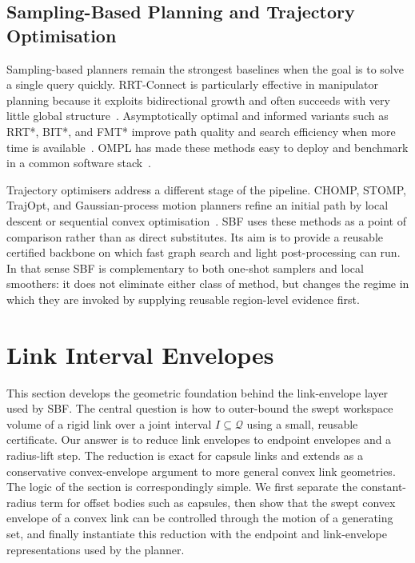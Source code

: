 \documentclass[journal]{IEEEtran}
\newcommand{\sbf}{\textsc{SBF}}
\newcommand{\Q}{\ensuremath{\mathcal{Q}}}
\begin{document}
\subsection{Sampling-Based Planning and Trajectory Optimisation}

Sampling-based planners remain the strongest baselines when the goal is to solve
a single query quickly. RRT-Connect is particularly effective in manipulator
planning because it exploits bidirectional growth and often succeeds with very
little global structure~\cite{kuffner2000rrt}. Asymptotically optimal and
informed variants such as RRT*, BIT*, and FMT* improve path quality and search
efficiency when more time is available~\cite{karaman2011sampling,
gammell2015batch,gammell2018informed,janson2015fmt}. OMPL has made these
methods easy to deploy and benchmark in a common software stack~\cite{sucan2012ompl,
moll2015benchmarking}.

Trajectory optimisers address a different stage of the pipeline. CHOMP, STOMP,
TrajOpt, and Gaussian-process motion planners refine an initial path by local
descent or sequential convex optimisation~\cite{ratliff2009chomp,
kalakrishnan2011stomp,schulman2014motion,mukadam2018gpmp2}. SBF uses these
methods as a point of comparison rather than as direct substitutes. Its aim is
to provide a reusable certified backbone on which fast graph search and light
post-processing can run. In that sense SBF is complementary to both one-shot
samplers and local smoothers: it does not eliminate either class of method, but
changes the regime in which they are invoked by supplying reusable region-level
evidence first.

\section{Link Interval Envelopes}\label{sec:link_envelopes}

This section develops the geometric foundation behind the link-envelope layer
used by \sbf{}. The central question is how to outer-bound the swept workspace
volume of a rigid link over a joint interval $I \subseteq \Q$ using a small,
reusable certificate. Our answer is to reduce link envelopes to endpoint
envelopes and a radius-lift step. The reduction is exact for capsule links and
extends as a conservative convex-envelope argument to more general convex link
geometries. The logic of the section is correspondingly simple. We first
separate the constant-radius term for offset bodies such as capsules, then show
that the swept convex envelope of a convex link can be controlled through the
motion of a generating set, and finally instantiate this reduction with the
endpoint and link-envelope representations used by the planner.
\end{document}
